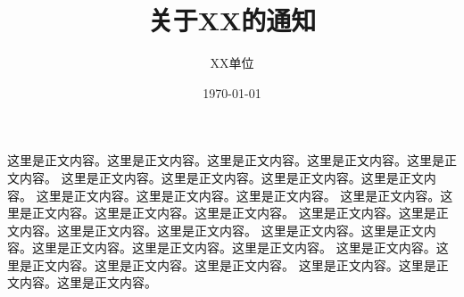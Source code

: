 \documentclass{redhead}
\title{关于XX的通知}
\author{XX单位}
\date{\today}
\begin{document}
\maketitle

这里是正文内容。这里是正文内容。这里是正文内容。这里是正文内容。这里是正文内容。
这里是正文内容。这里是正文内容。这里是正文内容。这里是正文内容。
这里是正文内容。这里是正文内容。这里是正文内容。
这里是正文内容。这里是正文内容。这里是正文内容。这里是正文内容。
这里是正文内容。这里是正文内容。这里是正文内容。这里是正文内容。
这里是正文内容。这里是正文内容。这里是正文内容。这里是正文内容。这里是正文内容。
这里是正文内容。这里是正文内容。这里是正文内容。这里是正文内容。
这里是正文内容。这里是正文内容。这里是正文内容。

\makeend
\end{document}
